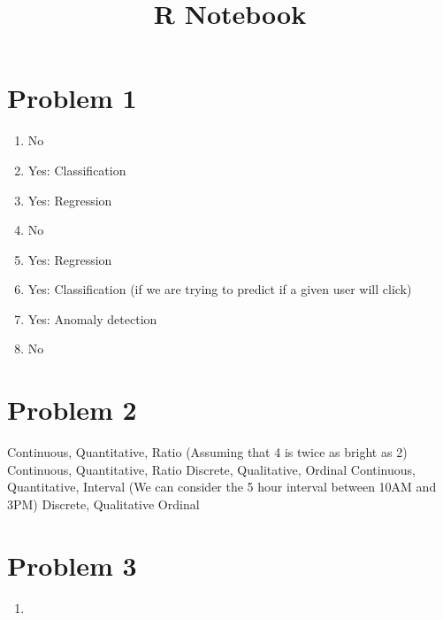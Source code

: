 \documentclass[]{article}
\title{R Notebook}
\author{}
\date{}
\newenvironment{Shaded}{\begin{snugshade}}{\end{snugshade}}
\newcommand{\KeywordTok}[1]{\textcolor[rgb]{0.13,0.29,0.53}{\textbf{#1}}}
\newcommand{\StringTok}[1]{\textcolor[rgb]{0.31,0.60,0.02}{#1}}
\newcommand{\NormalTok}[1]{#1}
\providecommand{\tightlist}{%
  \setlength{\itemsep}{0pt}\setlength{\parskip}{0pt}}
\begin{document}
\maketitle

\section{Problem 1}\label{problem-1}

\begin{enumerate}
\def\labelenumi{\alph{enumi})}
\tightlist
\item
  No
\item
  Yes: Classification
\item
  Yes: Regression
\item
  No
\item
  Yes: Regression
\item
  Yes: Classification (if we are trying to predict if a given user will
  click)
\item
  Yes: Anomaly detection
\item
  No
\end{enumerate}

\section{Problem 2}\label{problem-2}

Continuous, Quantitative, Ratio (Assuming that 4 is twice as bright as
2) Continuous, Quantitative, Ratio Discrete, Qualitative, Ordinal
Continuous, Quantitative, Interval (We can consider the 5 hour interval
between 10AM and 3PM) Discrete, Qualitative Ordinal

\section{Problem 3}\label{problem-3}

\begin{enumerate}
\def\labelenumi{\alph{enumi})}
\item
\end{enumerate}

\begin{Shaded}
\end{Shaded}
\end{document}
